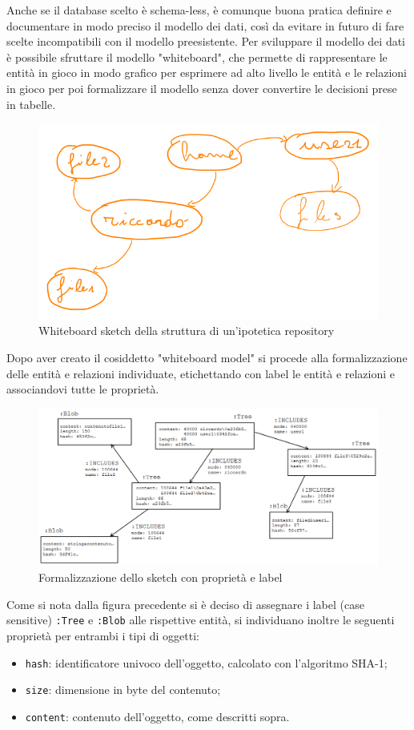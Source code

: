 Anche se il database scelto è schema-less, è comunque buona pratica definire e documentare in modo preciso il modello dei dati, così da evitare in futuro di fare scelte incompatibili con il modello preesistente.
Per sviluppare il modello dei dati è possibile sfruttare il modello "whiteboard", che permette di rappresentare le entità in gioco in modo grafico per esprimere ad alto livello le entità e le relazioni in gioco per poi formalizzare il modello senza dover convertire le decisioni prese in tabelle.
\begin{figure}[H]
    \centering
    \includegraphics[width=15cm]{./immagini/whiteboard_sketch.png}
    \caption{Whiteboard sketch della struttura di un'ipotetica repository}
\end{figure}
Dopo aver creato il cosiddetto "whiteboard model" si procede alla formalizzazione delle entità e relazioni individuate, etichettando con label le entità e relazioni e associandovi tutte le proprietà.
\begin{figure}[H]
    \centering
    \includegraphics[width=15cm]{./immagini/whiteboard_formal.png}
    \caption{Formalizzazione dello sketch con proprietà e label}
\end{figure}
Come si nota dalla figura precedente si è deciso di assegnare i label (case sensitive) \texttt{:Tree} e \texttt{:Blob} alle rispettive entità, si individuano inoltre le seguenti proprietà per entrambi i tipi di oggetti:
\begin{itemize}
    \item \texttt{hash}: identificatore univoco dell'oggetto, calcolato con l'algoritmo SHA-1;
    \item \texttt{size}: dimensione in byte del contenuto;
    \item \texttt{content}: contenuto dell'oggetto, come descritti sopra.
\end{itemize}

